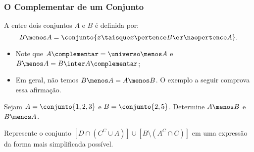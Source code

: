 \begin{frame}
	\frametitle{O Complementar de um Conjunto}

	\begin{definicao}[Diferença]
		A  entre dois conjuntos $A$ e $B$ é definida por:
		\[
			B \menos A = \conjunto { x \taisque x \pertence B \e x \naopertence A}.
		\]
	\end{definicao}\pause

	\begin{itemize}
		\item Note que $A\complementar = \universo \menos A$ e $B \menos A = B \inter A\complementar$;
		\item Em geral, não temos $B \menos A = A \menos B$. O exemplo a seguir comprova essa afirmação.
	\end{itemize}\pause

	\begin{exemplo}
		Sejam $A = \conjunto{1, 2, 3}$ e $B = \conjunto{2, 5}$. Determine $A \menos B$ e $B \menos A$.
	\end{exemplo}\pause

	\begin{exemplo}
		Represente o conjunto $\left[ D \cap \left( C^C \cup A\right)\right] \cup  [B \setminus (A^C \cap C)]$ em uma expressão da forma mais simplificada possível.
	\end{exemplo}
\end{frame}